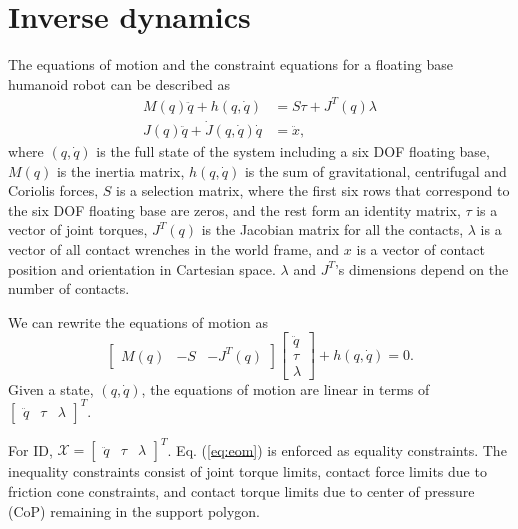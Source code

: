 \documentclass{ws-ijhr}
\newcommand{\eref}[1] {Eq. (\ref{#1})}
\newcommand{\QPx}{\mathcal{X}}
\begin{document}
\section{Inverse dynamics}
The equations of motion and the constraint equations for a floating base humanoid 
robot can be described as
\begin{equation*}
  \begin{split}
    M(q)\ddot{q} + h(q,\dot{q}) &= S\tau + J^T(q)\lambda \\
    J(q)\ddot{q} + \dot{J}(q,\dot{q})\dot{q} &= \ddot{x},
  \end{split}
\end{equation*}
where $(q,\dot{q})$ is the full state of the system including a six DOF floating 
base, $M(q)$ is the inertia matrix, $h(q,\dot{q})$ 
is the sum of gravitational, centrifugal and Coriolis forces, $S$ is a selection
matrix, where the first six rows that correspond to the six DOF floating base are 
zeros, and the rest form an identity matrix, $\tau$ is a vector of joint torques, 
$J^T(q)$ is the Jacobian matrix for all the contacts, $\lambda$ is a vector
of all contact wrenches in the world frame, and $x$ is a vector of  
contact position and orientation in Cartesian space. $\lambda$ and $J^T$'s 
dimensions depend on the number of contacts. 

We can rewrite the equations of motion as 
\begin{equation}
  \begin{bmatrix} M(q) & -S & -J^T(q) \end{bmatrix} 
  \begin{bmatrix} \ddot{q} \\ \tau \\ \lambda \end{bmatrix}
  +h(q,\dot{q}) = 0.
		\label{eq:eom}
\end{equation}
Given a state, $(q,\dot{q})$, the equations of motion are linear in terms of 
$\begin{bmatrix} \ddot{q} & \tau & \lambda \end{bmatrix}^T$. 

For ID, $\QPx = \begin{bmatrix} \ddot{q} & \tau & \lambda \end{bmatrix}^T$.
\eref{eq:eom} is enforced as equality constraints. The 
inequality constraints consist of joint torque limits, contact force limits 
due to friction cone constraints, and contact torque limits due to center of 
pressure (CoP) remaining in the support polygon. 
\end{document}
